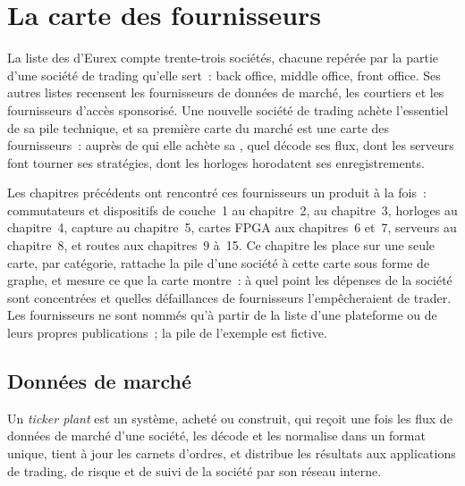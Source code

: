 \chapter{La carte des fournisseurs}\label{ch:nw:the-vendor-map}

La liste des  d'Eurex compte trente-trois sociétés, chacune repérée par la partie d'une société de trading qu'elle sert~: back office, middle office, front office.
Ses autres listes recensent les fournisseurs de données de marché, les courtiers et les fournisseurs d'accès
sponsorisé. Une nouvelle société de trading achète l'essentiel de sa pile technique, et sa première carte du marché est une carte des fournisseurs~: auprès de qui elle achète
sa , quel  décode ses flux, dont les serveurs font tourner ses stratégies, dont les horloges horodatent ses enregistrements.

Les chapitres précédents ont rencontré ces fournisseurs un produit à la fois~: commutateurs et dispositifs de couche~1 au chapitre~2, 
au chapitre~3, horloges au chapitre~4, capture au chapitre~5, cartes FPGA aux chapitres~6 et~7, serveurs au chapitre~8,  et
routes aux chapitres~9 à~15. Ce chapitre les place sur une seule carte, par catégorie, rattache la pile d'une société à cette carte sous forme de graphe, et
mesure ce que la carte montre~: à quel point les dépenses de la société sont concentrées et quelles défaillances de fournisseurs l'empêcheraient de trader. Les fournisseurs
ne sont nommés qu'à partir de la liste d'une plateforme ou de leurs propres publications~; la pile de l'exemple est fictive.

\section{Données de marché}

\begin{definition}\label{def:nw:the-vendor-map:tickerplant}
Un \emph{ticker plant} est un système, acheté ou construit, qui reçoit une fois les flux de données de marché d'une société, les décode
et les normalise dans un format unique, tient à jour les carnets d'ordres, et distribue les résultats aux applications de trading, de risque et
de suivi de la société par son réseau interne.
\end{definition}

